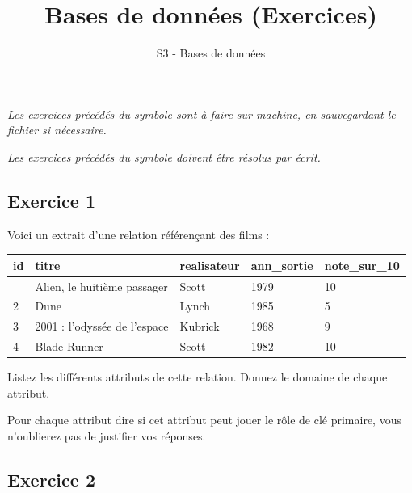 \documentclass[
  letterpaper,
  DIV=11,
  numbers=noendperiod]{scrartcl}
\title{Bases de données (Exercices)}
\subtitle{S3 - Bases de données}
\author{}
\date{}
\begin{document}
\maketitle
{}  \chead{} \cfoot{}   \renewcommand{\headrulewidth}{0pt} \renewcommand{\footrulewidth}{0pt} \thispagestyle{fancy} \vspace{-3cm}

\ifdefined\Shaded\renewenvironment{Shaded}{\begin{tcolorbox}[interior hidden, sharp corners, frame hidden, boxrule=0pt, enhanced, borderline west={3pt}{0pt}{shadecolor}, breakable]}{\end{tcolorbox}}\fi

\emph{Les exercices précédés du symbole  sont à faire
sur machine, en sauvegardant le fichier si nécessaire.}

\emph{Les exercices précédés du symbole  doivent être
résolus par écrit.}

\hypertarget{fa-solid-pencil-alt-exercice-1}{%
\subsection{\texorpdfstring{ Exercice
1}{ Exercice 1}}\label{fa-solid-pencil-alt-exercice-1}}

Voici un extrait d'une relation référençant des films :

\begin{longtable}[]{@{}lllll@{}}
\toprule\noalign{}
id & titre & realisateur & ann\_sortie & note\_sur\_10 \\
\midrule\noalign{}
\endhead
\bottomrule\noalign{}
\endlastfoot
1 & Alien, le huitième passager & Scott & 1979 & 10 \\
2 & Dune & Lynch & 1985 & 5 \\
3 & 2001 : l'odyssée de l'espace & Kubrick & 1968 & 9 \\
4 & Blade Runner & Scott & 1982 & 10 \\
\end{longtable}

Listez les différents attributs de cette relation. Donnez le domaine de
chaque attribut.

Pour chaque attribut dire si cet attribut peut jouer le rôle de clé
primaire, vous n'oublierez pas de justifier vos réponses.

\hypertarget{fa-solid-pencil-alt-exercice-2}{%
\subsection{\texorpdfstring{ Exercice
2}{ Exercice 2}}\label{fa-solid-pencil-alt-exercice-2}}
\end{document}
